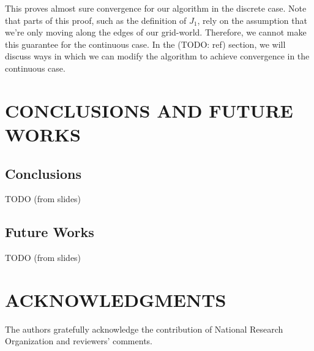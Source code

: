 This proves almost sure convergence for our algorithm in the discrete case. Note that parts of this proof, such as the definition of $J_1$, rely on the assumption that we're only moving along the edges of our grid-world. Therefore, we cannot make this guarantee for the continuous case. In the (TODO: ref) section, we will discuss ways in which we can modify the algorithm to achieve convergence in the continuous case.








\section{CONCLUSIONS AND FUTURE WORKS}

\subsection{Conclusions}

TODO (from slides) 
\subsection{Future Works}
TODO (from slides)


\section{ACKNOWLEDGMENTS}

The authors gratefully acknowledge the contribution of National Research Organization and reviewers' comments.



